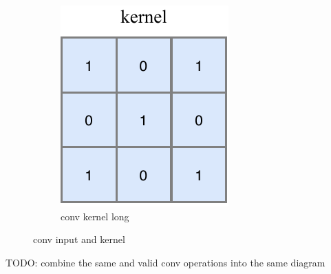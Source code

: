 \begin{figure}
\begin{subfigure}[b]{0.4\textwidth}
        \includegraphics[width=\textwidth]{diagrams/7-cvn/conv_kernel.pdf}
        \caption{conv kernel long}
        \label{fig:conv_kernel}
    \end{subfigure}
    \caption{conv input and kernel}
    \label{fig:conv_input_kernel}
\end{figure}

TODO: combine the same and valid conv operations into the same diagram

